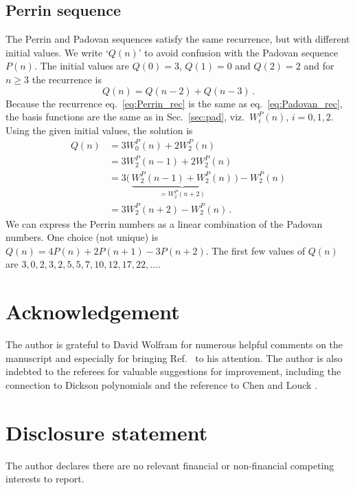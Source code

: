 \documentclass[review]{elsarticle}
\theoremstyle{plain}
\begin{document}
\subsection{Perrin sequence}\label{sec:per}
The Perrin and Padovan sequences satisfy the same recurrence, but with different initial values.
We write `$Q(n)$' to avoid confusion with the Padovan sequence $P(n)$.
The initial values are $Q(0)=3$, $Q(1)=0$ and $Q(2)=2$ and for $n\ge3$ the recurrence is
\begin{equation}
\label{eq:Perrin_rec}  
Q(n) = Q(n-2) + Q(n-3) \,.
\end{equation}
Because the recurrence eq.~\eqref{eq:Perrin_rec} is the same as eq.~\eqref{eq:Padovan_rec},
the basis functions are the same as in Sec.~\ref{sec:pad},
viz.~$W^P_i(n)$, $i=0,1,2$.
Using the given initial values, the solution is
\begin{equation}
\begin{split}
Q(n) &= 3W^P_0(n) +2W^P_2(n)
\\
&= 3W^P_2(n-1) +2W^P_2(n)
\\
&= 3\bigl(\,\underbrace{W^P_2(n-1) +W^P_2(n)}_{=W^P_2(n+2)}\,\bigr) -W^P_2(n)
\\
&= 3W^P_2(n+2) -W^P_2(n) \,.
\end{split}
\end{equation}
We can express the Perrin numbers as a linear combination of the Padovan numbers.
One choice (not unique) is $Q(n) = 4P(n) +2P(n+1) -3P(n+2)$.
The first few values of $Q(n)$ are $3,0,2,3,2,5,5,7,10,12,17,22,\dots$.

\section*{Acknowledgement}
The author is grateful to David Wolfram for numerous helpful comments on the manuscript
and especially for bringing Ref.~\cite{Wolfram2000} to his attention.
The author is also indebted to the referees for valuable suggestions for improvement,
including the connection to Dickson polynomials
and the reference to Chen and Louck \cite{ChenLouck}.

\section*{Disclosure statement}
The author declares there are no relevant financial or non-financial competing interests to report.
\end{document}

